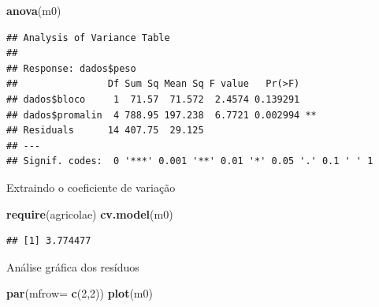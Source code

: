 \documentclass[
]{book}
\newenvironment{Shaded}{\begin{snugshade}}{\end{snugshade}}
\newcommand{\DataTypeTok}[1]{\textcolor[rgb]{0.13,0.29,0.53}{#1}}
\newcommand{\DecValTok}[1]{\textcolor[rgb]{0.00,0.00,0.81}{#1}}
\newcommand{\KeywordTok}[1]{\textcolor[rgb]{0.13,0.29,0.53}{\textbf{#1}}}
\newcommand{\NormalTok}[1]{#1}
\newcommand{\OperatorTok}[1]{\textcolor[rgb]{0.81,0.36,0.00}{\textbf{#1}}}
\newcommand{\StringTok}[1]{\textcolor[rgb]{0.31,0.60,0.02}{#1}}
\begin{document}
\begin{Shaded}
\end{Shaded}

\begin{Shaded}
\begin{Highlighting}[]
\KeywordTok{anova}\NormalTok{(m0)}
\end{Highlighting}
\end{Shaded}

\begin{verbatim}
## Analysis of Variance Table
## 
## Response: dados$peso
##                Df Sum Sq Mean Sq F value   Pr(>F)   
## dados$bloco     1  71.57  71.572  2.4574 0.139291   
## dados$promalin  4 788.95 197.238  6.7721 0.002994 **
## Residuals      14 407.75  29.125                    
## ---
## Signif. codes:  0 '***' 0.001 '**' 0.01 '*' 0.05 '.' 0.1 ' ' 1
\end{verbatim}

Extraindo o coeficiente de variação

\begin{Shaded}
\begin{Highlighting}[]
\KeywordTok{require}\NormalTok{(agricolae)}
\KeywordTok{cv.model}\NormalTok{(m0)}
\end{Highlighting}
\end{Shaded}

\begin{verbatim}
## [1] 3.774477
\end{verbatim}

Análise gráfica dos resíduos

\begin{Shaded}
\begin{Highlighting}[]
\KeywordTok{par}\NormalTok{(}\DataTypeTok{mfrow=} \KeywordTok{c}\NormalTok{(}\DecValTok{2}\NormalTok{,}\DecValTok{2}\NormalTok{))}
\KeywordTok{plot}\NormalTok{(m0)}
\end{Highlighting}
\end{Shaded}
\end{document}
